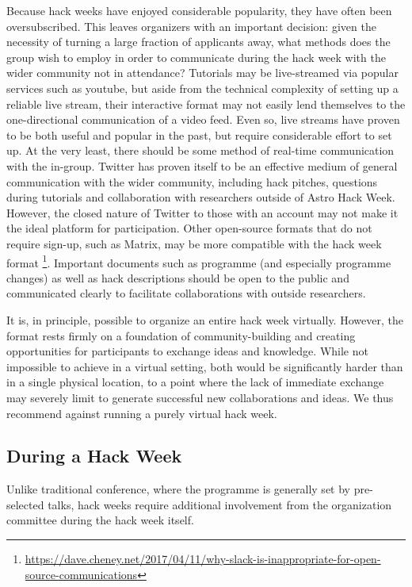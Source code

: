 \documentclass{aastex62}
\begin{document}
Because hack weeks have enjoyed considerable popularity, they have often been oversubscribed. This leaves organizers with an important decision: given the necessity of turning a large fraction of applicants away, what methods does the group wish to employ in order to communicate during the hack week with the wider community not in attendance? Tutorials may be live-streamed via popular services such as youtube, but aside from the technical complexity of setting up a reliable live stream, their interactive format may not easily lend themselves to the one-directional communication of a video feed. Even so, live streams have proven to be both useful and popular in the past, but require considerable effort to set up. At the very least, there should be some method of real-time communication with the in-group. Twitter has proven itself to be an effective medium of general communication with the wider community, including hack pitches, questions during tutorials and collaboration with researchers outside of Astro Hack Week. However, the closed nature of Twitter to those with an account may not make it the ideal platform for participation. Other open-source formats that do not require sign-up, such as Matrix, may be more compatible with the hack week format \footnote{\url{https://dave.cheney.net/2017/04/11/why-slack-is-inappropriate-for-open-source-communications}}. Important documents such as programme (and especially programme changes) as well as hack descriptions should be open to the public and communicated clearly to facilitate collaborations with outside researchers.

It is, in principle, possible to organize an entire hack week virtually. However, the format rests firmly on a foundation of community-building and creating opportunities for participants to exchange ideas and knowledge. While not impossible to achieve in a virtual setting, both would be significantly harder than in a single physical location, to a point where the lack of immediate exchange may severely limit to generate successful new collaborations and ideas. We thus recommend against running a purely virtual hack week.

\clearpage 
\subsection{During a Hack Week}

Unlike traditional conference, where the programme is generally set by pre-selected talks, hack weeks require additional involvement from the organization committee during the hack week itself.
\end{document}
